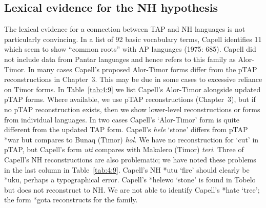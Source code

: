 \subsection{Lexical evidence for the NH hypothesis}
The lexical evidence for a connection between TAP and NH languages is not particularly convincing. In a list of 92 basic vocabulary terms, Capell identifies 11 which seem to show ``common roots'' with AP languages (1975: 685). Capell did not include data from Pantar languages and hence refers to this family as Alor-Timor. In many cases Capell's proposed Alor-Timor forms differ from the pTAP reconstructions in Chapter~3. This may be due in some cases to excessive reliance on Timor forms. In Table~\ref{tab:4:9} we list Capell's Alor-Timor alongside updated pTAP forms. Where available, we use pTAP reconstructions (Chapter~3), but if no pTAP reconstruction exists, then we show lower-level reconstructions or forms from individual languages. In two cases Capell's `Alor-Timor' form is quite different from the updated TAP form. Capell's \textit{hele} `stone' differs from pTAP *war but compares to Bunaq (Timor) \textit{hol. }We have no reconstruction for `cut' in pTAP, but Capell's form \textit{uti }compares with Makalero (Timor)
 \textit{teri}. Three of Capell's NH reconstructions are also problematic; we have noted these problems in the last column in Table~\ref{tab:4:9}. Capell's NH *utu `fire' should clearly be *uku, perhaps a typographical error. Capell's *helewo `stone' is found in Tobelo but does not reconstruct to NH. We are not able to identify Capell's *hate `tree'; the form *gota reconstructs for the family.




